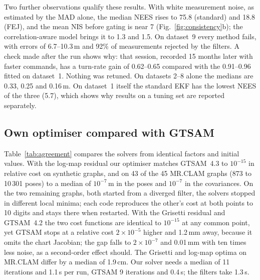 \documentclass[conference]{IEEEtran}
\begin{document}
Two further observations qualify these results. With white measurement noise, as estimated by the MAD alone, the median NEES rises to 75.8 (standard) and 18.8 (FEJ), and the mean NIS before gating is near 7 (Fig.~\ref{fig:consistency}b); the correlation-aware model brings it to 1.3 and 1.5. On dataset~9 every method fails, with errors of 6.7--10.3\,m and 92\% of measurements rejected by the filters. A check made after the run shows why: that session, recorded 15 months later with faster commands, has a turn-rate gain of 0.62--0.65 compared with the 0.91--0.96 fitted on dataset~1. Nothing was retuned. On datasets 2--8 alone the medians are 0.33, 0.25 and 0.16\,m. On dataset~1 itself the standard EKF has the lowest NEES of the three (5.7), which shows why results on a tuning set are reported separately.

\subsection{Own optimiser compared with GTSAM}
Table~\ref{tab:agreement} compares the solvers from identical factors and initial values. With the log-map residual our optimiser matches GTSAM~4.3 to $10^{-15}$ in relative cost on synthetic graphs, and on 43 of the 45 MR.CLAM graphs (873 to 10\,301 poses) to a median of $10^{-7}$\,m in the poses and $10^{-7}$ in the covariances. On the two remaining graphs, both started from a diverged filter, the solvers stopped in different local minima; each code reproduces the other's cost at both points to 10 digits and stays there when restarted. With the Grisetti residual and GTSAM~4.2 the two cost functions are identical to $10^{-15}$ at any common point, yet GTSAM stops at a relative cost $2\times10^{-5}$ higher and 1.2\,mm away, because it omits the chart Jacobian; the gap falls to $2\times10^{-7}$ and 0.01\,mm with ten times less noise, as a second-order effect should. The Grisetti and log-map optima on MR.CLAM differ by a median of 1.9\,cm. Our solver needs a median of 11 iterations and 1.1\,s per run, GTSAM 9 iterations and 0.4\,s; the filters take 1.3\,s.

\begin{table}[t]
\caption{Own optimiser compared with GTSAM from identical factors and initial values: median (largest) over problems.}
\label{tab:agreement}
\centering
\footnotesize
\setlength{\tabcolsep}{4pt}

\end{table}
\end{document}
